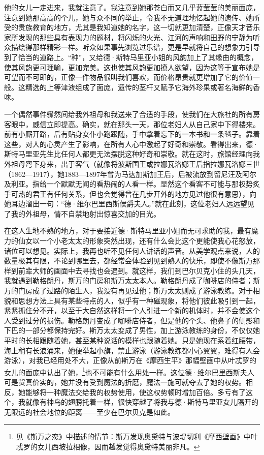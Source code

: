 \par 他的女儿一走进来，我就注意了。我注意到她那苍白而又几乎蓝莹莹的美丽面庞，注意到她那高高的个儿，她与众不同的举止，令我不无道理地忆起她的遗传、她所受的贵族教育的地方，尤其是我知道她的名字，这一切就更加清楚，正像天才音乐家所发现的那些具有表现力的题材，将闪烁的火光、江河的声响和田野的宁静为听众描绘得那样精彩一样。听众如果事先浏览过乐谱，更是早就将自己的想象力引导到了恰当的道路上。“种”，又给德·斯特马里亚小姐的风韵加上了其缘由的概念，使其风韵更可理喻，更加完美。这也使其风韵更加撩人欲望，因为这等于宣布她是可望而不可即的，正像一件物品很叫我们喜欢，而价格昂贵就更增加了它的价值一般。这精选的上等津液组成了面庞，遗传的茎杆又赋予它海外珍果或著名海鲜的香味。
\par 一个偶然事件骤然间给我外祖母和我送来了合适的手段，使我们在大旅社的所有房客眼中，威信立即提高。确实，就在那头一天，那位老妇人从自己家中下得楼来。前有小厮开路，后有贴身女仆小跑跟随，手中拿着忘下的一本书和一条毯子。靠着这些，对人的心灵产生了影响，在所有人心中激起了好奇和崇敬。看得出来，德·斯特马里亚先生比任何人都更无法摆脱这种好奇和崇敬。就在这时，旅馆经理向我外祖母弯下身来，出于客气（就像将波斯国王或拉娜瓦洛娜王后指拉娜瓦洛娜三世（1862—1917），她1883—1897年曾为马达加斯加王后，后被流放到留尼汪及阿尔及利亚。指给一个默默无闻的看热闹的人看一样。显然这个看客不可能与那权势炙手可热的君王有任何关系，但也会觉得曾在几步开外的地方见过他很有意思），向她耳边溜出一句：“德·维尔巴里西斯侯爵夫人。”就在此刻，这位老妇人远远望见了我的外祖母，情不自禁地射出惊喜交加的目光。
\par 在这人生地不熟的地方，对于要接近德·斯特马里亚小姐而无可求助的我，最有魔力的仙女以一个小老太太的形象突然出现，还有什么会比这个更能使我心花怒放，诸位可以想见。实际上，我再也听不见任何人讲话的声音。从美学观点来说，人的数量极其有限，不论到哪里去，都经常会体验到见到熟人的快乐，即使不像斯万那样到前辈大师的画面中去寻找也会遇到。就这样，我们到巴尔贝克小住的头几天，我就遇到勒格朗丹，斯万的门房和斯万太太本人。勒格朗丹成了咖啡店的侍者；斯万的门房成了过路的陌生人，我没有再见过他；斯万太太则成了游泳教练。对于相貌和思想方法上具有某些特点的人，似乎有一种磁现象，将他们彼此吸引到一起，紧紧抓住分不开，以至于大自然这样将一个人引进一个新的机体时，并不会使这个人受到过分的损伤。勒格朗丹变成了咖啡店侍者，但是他的个头、他鼻子的侧影和下巴的一部分都保持完好。斯万太太变成了男性，加上游泳教练的身份，不仅仅她平时的长相跟随着她，甚至某种说话的模样也跟随着她。只是她现在系着红腰带，海上稍有长浪涌来，她便举起小旗，禁止游泳（游泳教练都小心翼翼，难得有人会游泳），对我已经用处不大，正像从前斯万在《摩西生平》那幅壁画中从叶忒罗的女儿的面庞中认出了她，\footnote{见《斯万之恋》中描述的情节：斯万发现奥黛特与波堤切利《摩西壁画》中叶忒罗的女儿西坡拉相像，因而越发觉得奥黛特美丽非凡。}也不可能有什么用处一样。这位德·维尔巴里西斯夫人可是货真价实的，她并没有受到魔法的折磨，魔法一施可就夺去了她的权势。相反，她能够将一种魔法交给我的权势使用，使这权势顿时增加百倍。多亏有了这个，我就像有神鸟的翅膀托着一样，很快穿越了将我与德·斯特马里亚女儿隔开的无限远的社会地位的距离——至少在巴尔贝克是如此。
